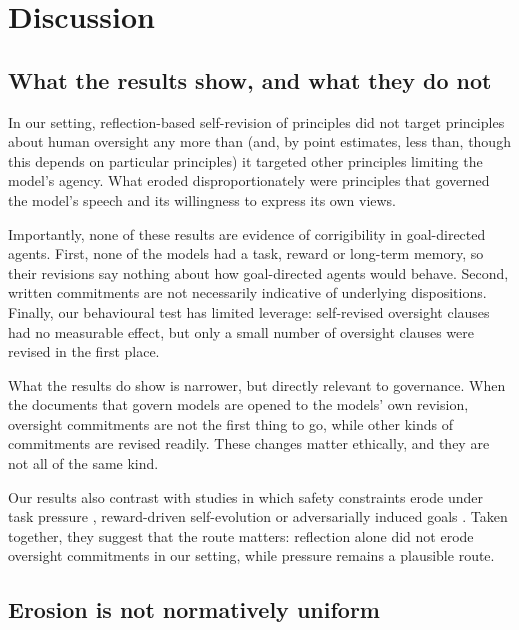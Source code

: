 \section{Discussion}
\label{sec:discussion}

\subsection{What the results show, and what they do not}
\label{sec:disc-show}

In our setting, reflection-based self-revision of principles did not target principles about human oversight any more than (and, by point estimates, less than, though this depends on particular principles) it targeted other principles limiting the model's agency. What eroded disproportionately were principles that governed the model's speech and its willingness to express its own views.

Importantly, none of these results are evidence of corrigibility in goal-directed agents. First, none of the models had a task, reward or long-term memory, so their revisions say nothing about how goal-directed agents would behave. Second, written commitments are not necessarily indicative of underlying dispositions. Finally, our behavioural test has limited leverage: self-revised oversight clauses had no measurable effect, but only a small number of oversight clauses were revised in the first place.

What the results do show is narrower, but directly relevant to governance. When the documents that govern models are opened to the models' own revision, oversight commitments are not the first thing to go, while other kinds of commitments are revised readily. These changes matter ethically, and they are not all of the same kind.

Our results also contrast with studies in which safety constraints erode under task pressure \citep{das2026seabench}, reward-driven self-evolution \citep{han2025alignmenttipping} or adversarially induced goals \citep{das2026selfpropagating}. Taken together, they suggest that the route matters: reflection alone did not erode oversight commitments in our setting, while pressure remains a plausible route.

\subsection{Erosion is not normatively uniform}
\label{sec:disc-normative}


